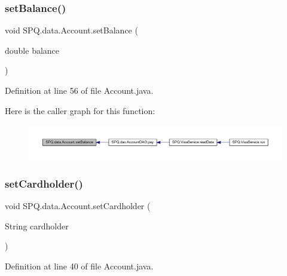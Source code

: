 \subsubsection{\texorpdfstring{set\+Balance()}{setBalance()}}
{\footnotesize\ttfamily void S\+P\+Q.\+data.\+Account.\+set\+Balance (\begin{DoxyParamCaption}\item[{double}]{balance }\end{DoxyParamCaption})}



Definition at line 56 of file Account.\+java.

Here is the caller graph for this function\+:
\nopagebreak
\begin{figure}[H]
\begin{center}
\leavevmode
\includegraphics[width=350pt]{class_s_p_q_1_1data_1_1_account_a7ac2f177ba411765320259ed3a63b5b2_icgraph}
\end{center}
\end{figure}
\mbox{\label{class_s_p_q_1_1data_1_1_account_a4298cea2ae84ed5eae60f67fe61e433a}} 
\subsubsection{\texorpdfstring{set\+Cardholder()}{setCardholder()}}
{\footnotesize\ttfamily void S\+P\+Q.\+data.\+Account.\+set\+Cardholder (\begin{DoxyParamCaption}\item[{String}]{cardholder }\end{DoxyParamCaption})}



Definition at line 40 of file Account.\+java.

\mbox{\label{class_s_p_q_1_1data_1_1_account_afad9822abc150e4238b95280647d3e11}} 
